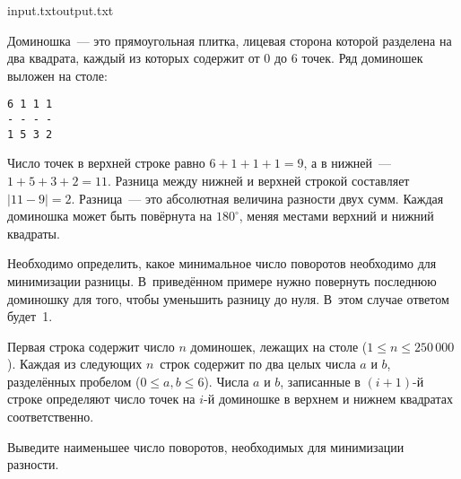 
\begin{rawproblem}{input.txt}{output.txt}

Доминошка~--- это прямоугольная плитка, лицевая сторона которой разделена на
два квадрата, каждый из которых содержит от 0 до 6 точек.
Ряд доминошек выложен на столе:

\begin{center}
\begin{verbatim}
6 1 1 1
- - - -
1 5 3 2
\end{verbatim}
\end{center}

Число точек в верхней строке равно $6 + 1 + 1 + 1 = 9$, а в
нижней~--- $1 + 5 + 3 + 2 = 11$.
Разница между нижней и верхней строкой составляет $|11 - 9| = 2$.
Разница~--- это абсолютная величина разности двух сумм.
Каждая доминошка может быть повёрнута на $180^{\circ}$,
меняя местами верхний и нижний квадраты.

Необходимо определить, какое минимальное число поворотов необходимо для
минимизации разницы.
В~приведённом примере нужно повернуть последнюю доминошку для того, чтобы
уменьшить разницу до нуля.
В~этом случае ответом будет~1.

\InputFile

Первая строка содержит число $n$ доминошек, лежащих на столе ($1 \le n \le 250\,000$).
Каждая из следующих $n$~строк содержит по два целых числа $a$ и $b$, разделённых
пробелом ($0 \le a, b \le 6$).
Числа $a$ и $b$, записанные в $(i + 1)$-й строке определяют число точек на
$i$-й доминошке в верхнем и нижнем квадратах соответственно.

\OutputFile

Выведите наименьшее число поворотов, необходимых для минимизации разности.

\Example

\begin{example}%
%
\end{example}


\end{rawproblem}

